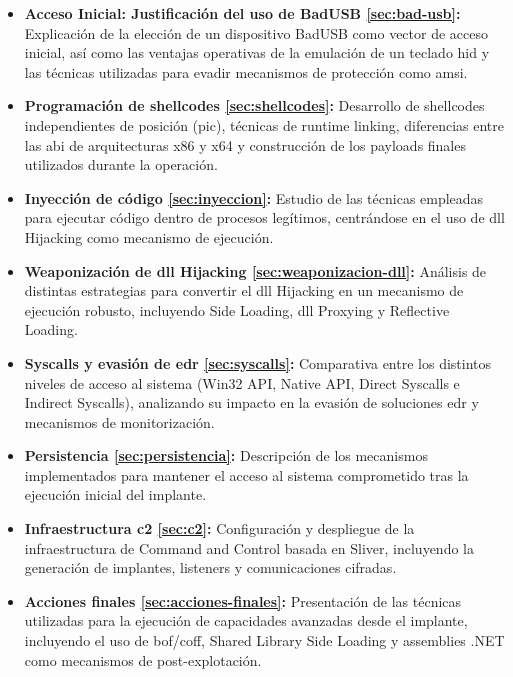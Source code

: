 \begin{itemize}

    \item \textbf{Acceso Inicial: Justificación del uso de BadUSB \ref{sec:bad-usb}:}
    Explicación de la elección de un dispositivo BadUSB como vector de acceso inicial, así como las ventajas operativas de la emulación de un teclado \acrshort{hid} y las técnicas utilizadas para evadir mecanismos de protección como \acrshort{amsi}.

    \item \textbf{Programación de shellcodes \ref{sec:shellcodes}:}
    Desarrollo de shellcodes independientes de posición (\acrshort{pic}), técnicas de runtime linking, diferencias entre las \acrshort{abi} de arquitecturas x86 y x64 y construcción de los payloads finales utilizados durante la operación.

    \item \textbf{Inyección de código \ref{sec:inyeccion}:}
    Estudio de las técnicas empleadas para ejecutar código dentro de procesos legítimos, centrándose en el uso de \acrshort{dll} Hijacking como mecanismo de ejecución.

    \item \textbf{Weaponización de \acrshort{dll} Hijacking \ref{sec:weaponizacion-dll}:}
    Análisis de distintas estrategias para convertir el \acrshort{dll} Hijacking en un mecanismo de ejecución robusto, incluyendo Side Loading, \acrshort{dll} Proxying y Reflective Loading.

    \item \textbf{Syscalls y evasión de \acrshort{edr} \ref{sec:syscalls}:}
    Comparativa entre los distintos niveles de acceso al sistema (Win32 API, Native API, Direct Syscalls e Indirect Syscalls), analizando su impacto en la evasión de soluciones \acrshort{edr} y mecanismos de monitorización.

    \item \textbf{Persistencia \ref{sec:persistencia}:}
    Descripción de los mecanismos implementados para mantener el acceso al sistema comprometido tras la ejecución inicial del implante.

    \item \textbf{Infraestructura \acrshort{c2} \ref{sec:c2}:}
    Configuración y despliegue de la infraestructura de Command and Control basada en Sliver, incluyendo la generación de implantes, listeners y comunicaciones cifradas.

    \item \textbf{Acciones finales \ref{sec:acciones-finales}:}
    Presentación de las técnicas utilizadas para la ejecución de capacidades avanzadas desde el implante, incluyendo el uso de \acrshort{bof}/\acrshort{coff}, Shared Library Side Loading y assemblies .NET como mecanismos de post-explotación.

\end{itemize}

